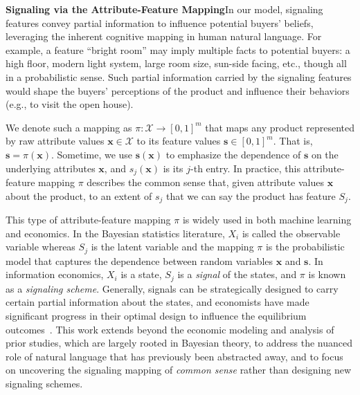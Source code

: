  \textbf{Signaling via the Attribute-Feature Mapping}\quad In our model, signaling features convey partial information to influence potential buyers' beliefs, leveraging the inherent cognitive mapping in human natural language. For example, a feature ``bright room'' may imply multiple facts to potential buyers:  a high floor,  modern light system, large room size, sun-side facing, etc., though all in a probabilistic sense. Such partial information carried by the signaling features would shape the buyers' perceptions of the product and influence their behaviors (e.g., to visit the open house).

We denote such a mapping as $\pi: \mathcal{X} \to [0,1]^m$ that maps any product represented by raw attribute values $\mathbf{x}\in \mathcal{X}$ to its feature values $\mathbf{s} \in [0,1]^m$. That is, $\mathbf{s} = \pi(\mathbf{x})$. Sometime, we use $\mathbf{s}(\mathbf{x})$ to emphasize the dependence of $\mathbf{s}$ on the underlying attributes $\mathbf{x}$, and $s_j(\mathbf{x})$ is its $j$-th entry. In practice, this attribute-feature mapping $\pi$ describes the common sense that, given attribute values  $\mathbf{x}$ about the product, to an extent of $s_j$ that we can say the product has feature $S_j$. 

This type of attribute-feature mapping $\pi$ is widely used in both machine learning and economics. In the Bayesian statistics literature,  $X_i$ is called the observable variable whereas  $S_j$ is the latent variable and the mapping $\pi$ is the probabilistic model that captures the dependence between random variables $\mathbf{x}$ and $\mathbf{s}$. In information economics, $X_i$ is a state, $S_j$ is a \emph{signal} of the states, and $\pi$ is known as a \emph{signaling scheme}. 
Generally, signals can be strategically designed to carry certain partial information about the states, and economists have made significant progress in their optimal design to influence the equilibrium outcomes~\citep{kamenica2011bayesian, bergemann2015limits,bergemann2019information}.  
This work extends beyond the economic modeling and analysis of prior studies, which are largely rooted in Bayesian theory, to address the nuanced role of natural language that has previously been abstracted away, and to focus on uncovering the signaling mapping of \emph{common sense} rather than designing new signaling schemes.

